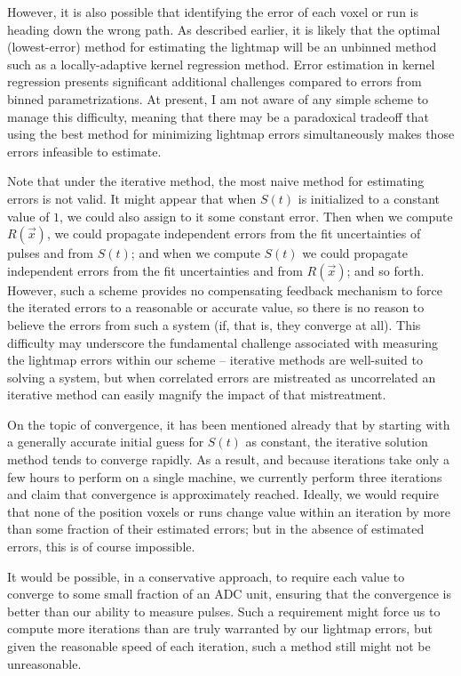 However, it is also possible that identifying the error of each voxel or run is heading down the wrong path.  As described earlier, it is likely that the optimal (lowest-error) method for estimating the lightmap will be an unbinned method such as a locally-adaptive kernel regression method.  Error estimation in kernel regression presents significant additional challenges compared to errors from binned parametrizations.  At present, I am not aware of any simple scheme to manage this difficulty, meaning that there may be a paradoxical tradeoff that using the best method for minimizing lightmap errors simultaneously makes those errors infeasible to estimate.

Note that under the iterative method, the most naive method for estimating errors is not valid.  It might appear that when $S(t)$ is initialized to a constant value of $1$, we could also assign to it some constant error.  Then when we compute $R(\vec{x})$, we could propagate independent errors from the fit uncertainties of pulses and from $S(t)$; and when we compute $S(t)$ we could propagate independent errors from the fit uncertainties and from $R(\vec{x})$; and so forth.  However, such a scheme provides no compensating feedback mechanism to force the iterated errors to a reasonable or accurate value, so there is no reason to believe the errors from such a system (if, that is, they converge at all).  This difficulty may underscore the fundamental challenge associated with measuring the lightmap errors within our scheme -- iterative methods are well-suited to solving a system, but when correlated errors are mistreated as uncorrelated an iterative method can easily magnify the impact of that mistreatment.

On the topic of convergence, it has been mentioned already that by starting with a generally accurate initial guess for $S(t)$ as constant, the iterative solution method tends to converge rapidly.  As a result, and because iterations take only a few hours to perform on a single machine, we currently perform three iterations and claim that convergence is approximately reached.  Ideally, we would require that none of the position voxels or runs change value within an iteration by more than some fraction of their estimated errors; but in the absence of estimated errors, this is of course impossible.

It would be possible, in a conservative approach, to require each value to converge to some small fraction of an ADC unit, ensuring that the convergence is better than our ability to measure pulses.  Such a requirement might force us to compute more iterations than are truly warranted by our lightmap errors, but given the reasonable speed of each iteration, such a method still might not be unreasonable.

